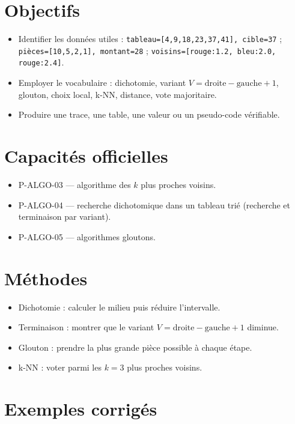 \documentclass[a4paper,11pt]{article}
\begin{document}

\section*{Objectifs}
\begin{itemize}[nosep]
  \item Identifier les données utiles : \texttt{tableau=[4,9,18,23,37,41], cible=37} ; \texttt{pièces=[10,5,2,1], montant=28} ; \texttt{voisins=[rouge:1.2, bleu:2.0, rouge:2.4]}.
  \item Employer le vocabulaire : dichotomie, variant $V = \text{droite} - \text{gauche} + 1$, glouton, choix local, k-NN, distance, vote majoritaire.
  \item Produire une trace, une table, une valeur ou un pseudo-code vérifiable.
\end{itemize}

\section*{Capacités officielles}
\begin{itemize}[nosep]
  \item P-ALGO-03 — algorithme des $k$ plus proches voisins.
  \item P-ALGO-04 — recherche dichotomique dans un tableau trié (recherche et terminaison par variant).
  \item P-ALGO-05 — algorithmes gloutons.
\end{itemize}

\section*{Méthodes}
\begin{itemize}[nosep]
  \item Dichotomie : calculer le milieu puis réduire l'intervalle.
  \item Terminaison : montrer que le variant $V = \text{droite} - \text{gauche} + 1$ diminue.
  \item Glouton : prendre la plus grande pièce possible à chaque étape.
  \item k-NN : voter parmi les $k=3$ plus proches voisins.
\end{itemize}

\section*{Exemples corrigés}
\end{document}
